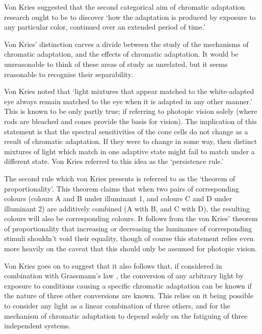 Von Kries suggested that the second categorical aim of chromatic adaptation research ought to be to discover `how the adaptation is produced by exposure to any particular color, continued over an extended period of time.' 

Von Kries' distinction carves a divide between the study of the mechanisms of chromatic adaptation, and the effects of chromatic adaptation. It would be unreasonable to think of these areas of study as unrelated, but it seems reasonable to recognise their separability. 


Von Kries noted that `light mixtures that appear matched to the white-adapted eye always remain matched to the eye when it is adapted in any other manner.' This is known to be only partly true; if referring to photopic vision solely (where rods are bleached and cones provide the basis for vision). The implication of this statement is that the spectral sensitivities of the cone cells do not change as a result of chromatic adaptation. If they were to change in some way, then distinct mixtures of light which match in one adaptive state might fail to match under a different state. Von Kries referred to this idea as the `persistence rule.'

The second rule which von Kries presents is referred to as the `theorem of proportionality'. This theorem claims that when two pairs of corresponding colours (colours A and B under illuminant 1, and colours C and D under illuminant 2) are additively combined (A with B, and C with D), the resulting colours will also be corresponding colours. It follows from the von Kries' theorem of proportionality that increasing or decreasing the luminance of corresponding stimuli shouldn't void their equality, though of course this statement relies even more heavily on the caveat that this should only be assumed for photopic vision.

Von Kries goes on to suggest that it also follows that, if considered in combination with Grassmann's law \citep{grassmann_zur_1853}, the conversion of any arbitrary light by exposure to conditions causing a specific chromatic adaptation can be known if the nature of three other conversions are known. This relies on it being possible to consider any light as a linear combination of three others, and for the mechanism of chromatic adaptation to depend solely on the fatiguing of three independent systems.

